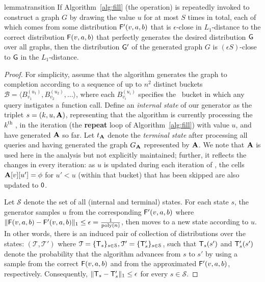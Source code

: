\begin{restatable}{lemma}{transition}\label{lemma:transition}
If Algorithm~\ref{alg:fill} (the  operation) is repeatedly invoked to construct a graph $G$ by drawing the value $u$ for at most $S$ times in total, each of which comes from some distribution $\mathsf{F}'(v,a,b)$ that is $\epsilon$-close in $L_1$-distance to the correct distribution $\mathsf{F}(v,a,b)$ that perfectly generates the desired distribution $\mathsf{G}$ over all graphs, then the distribution $\mathsf{G}'$ of the generated graph $G$ is $(\epsilon S)$-close to $\mathsf{G}$ in the $L_1$-distance.
\end{restatable}
\begin{proof}
\label{proof:transition}
For simplicity, assume that the algorithm generates the graph to completion according to a sequence of up to $n^2$ distinct buckets $\mathcal{B} = \langle B^{(u_1)}_{v_1}, B^{(u_2)}_{v_2}, \ldots \rangle$, where each $B^{(u_i)}_{v_i}$ specifies the \unfilled~bucket in which any query instigates a  function call. Define an \emph{internal state} of our generator as the triplet $s = (k, u, \mathbf{A})$, representing that the algorithm is currently processing the $k^\textrm{th}$ , in the iteration (the \textbf{repeat} loop of Algorithm~\ref{alg:fill}) with value $u$, and have generated $\mathbf{A}$ so far. Let $t_{\mathbf{A}}$ denote the \emph{terminal state} after processing all queries and having generated the graph $G_{\mathbf{A}}$ represented by $\mathbf{A}$. We note that $\mathbf{A}$ is used here in the analysis but not explicitly maintained; further, it reflects the changes in every iteration: as $u$ is updated during each iteration of , the cells $\mathbf{A}[v][u'] = \phi$ for $u' < u$ (within that bucket) that has been skipped are also updated to $\mathsf{0}$.

Let $\mathcal{S}$ denote the set of all (internal and terminal) states. For each state $s$, the generator samples $u$ from the corresponding $\mathsf{F}'(v,a,b)$ where $\|\mathsf{F}(v,a,b)-\mathsf{F}'(v,a,b)\|_1 \leq \epsilon = \frac{1}{\mathrm{poly}(n)}$, then moves to a new state according to $u$. In other words, there is an induced pair of collection of distributions over the states: $(\mathcal{T},\mathcal{T}')$ where $\mathcal{T}=\{\mathsf{T}_s\}_{s\in\mathcal{S}}, \mathcal{T}'=\{\mathsf{T}'_s\}_{s\in\mathcal{S}}$, such that $\mathsf{T}_s(s')$ and $\mathsf{T}'_s(s')$ denote the probability that the algorithm advances from $s$ to $s'$ by using a sample from the correct $\mathsf{F}(v,a,b)$ and from the approximated $\mathsf{F}'(v,a,b)$, respectively. Consequently, $\|\mathsf{T}_s-\mathsf{T}'_s\|_1 \leq \epsilon$ for every $s\in\mathcal{S}$.


\end{proof}
